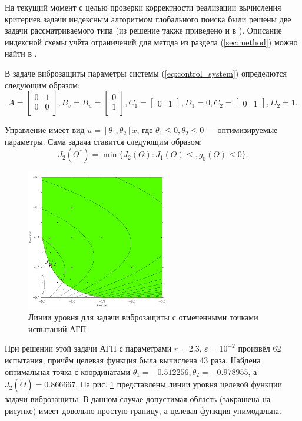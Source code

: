 На текущий момент с целью проверки корректности реализации вычисления критериев задачи
индексным алгоритмом глобального поиска были решены две задачи рассматриваемого типа
(из решение также приведено и в \cite{optControl}).
Описание индексной схемы учёта ограничений для метода из раздела (\ref{sec:method}) можно
найти в \cite{strOptBook}.

В задаче виброзащиты параметры системы (\ref{eq:control_system}) определются следующим
образом:
$$
A=\begin{bmatrix}
    0       & 1 \\
    0       & 0 \\
\end{bmatrix},
B_v=B_u=\begin{bmatrix}
  0       \\
  1       \\
\end{bmatrix},
C_1=\begin{bmatrix}
  0     & 1
\end{bmatrix},D_1=0,
C_2=\begin{bmatrix}
  0     & 1
\end{bmatrix},D_2=1.
$$

Управление имеет вид \(u=[\theta_1,\theta_2]x\), где \(\theta_1 \leqslant 0,\theta_2\leqslant 0\) ---
оптимизируемые параметры. Сама задача ставится следующим образом:
\begin{displaymath}
   J_2(\Theta^*)=\min\{J_2(\Theta):J_1(\Theta)\leqslant, g_0(\Theta)\leqslant 0\}.
\end{displaymath}

\begin{figure}[ht]
  \center
  \includegraphics[width=0.55\textwidth]{images/controlProblem.png}
  \caption{Линии уровня для задачи виброзащиты с отмеченными точками испытаний АГП}
  \label{fig:controlProblem}
\end{figure}
При решении этой задачи АГП с параметрами \(r=2.3\), \(\varepsilon=10^{-2}\) произвёл
62 испытания, причём целевая функция была вычислена 43 раза. Найдена оптимальная точка с координатами
\(\widetilde\theta_1 =-0.512256,\widetilde\theta_2=-0.978955\), а \(J_2(\widetilde\Theta)=0.866667\).
На рис. \ref{fig:controlProblem}
представлены линии уровня целевой функции задачи виброзащиты. В данном случае допустимая область (закрашена на рисунке)
имеет довольно простую границу, а целевая функция унимодальна.


